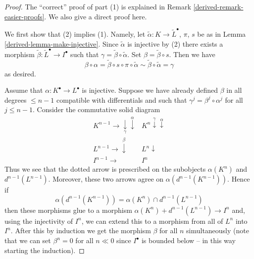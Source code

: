 \begin{proof}

The ``correct'' proof of part (1) is explained in
Remark \ref{derived-remark-easier-proofs}.
We also give a direct proof here.

\medskip\noindent
We first show that (2) implies (1). Namely, let
$\tilde \alpha : K \to \tilde L^\bullet$, $\pi$, $s$ be as in
Lemma \ref{derived-lemma-make-injective}. Since $\tilde \alpha$ is injective
by (2) there exists a morphism $\tilde \beta : \tilde L^\bullet \to I^\bullet$
such that $\gamma = \tilde \beta \circ \tilde \alpha$. Set
$\beta = \tilde \beta \circ s$. Then we have
$$
\beta \circ \alpha
=
\tilde \beta \circ s \circ \pi \circ \tilde \alpha
\sim
\tilde \beta \circ \tilde \alpha
=
\gamma
$$
as desired.

\medskip\noindent
Assume that $\alpha : K^\bullet \to L^\bullet$ is injective.
Suppose we have already defined $\beta$ in all degrees
$\leq n - 1$ compatible with differentials and such that
$\gamma^j = \beta^j \circ \alpha^j$ for all $j \leq n - 1$.
Consider the commutative solid diagram
$$
\begin{array}{cc}K^{n - 1} \longrightarrow\underset{\gamma}{\downarrow}\overset{\alpha}{\downarrow} & K^n \overset{\gamma}{\downarrow}\overset{\alpha}{\downarrow} \\ L^{n - 1} \longrightarrow\overset{\beta}{\downarrow} & L^n \downarrow \\ I^{n - 1} \longrightarrow & I^n\end{array}
$$
Thus we see that the dotted arrow is prescribed on the subobjects
$\alpha(K^n)$ and $d^{n - 1}(L^{n - 1})$. Moreover, these two arrows
agree on $\alpha(d^{n - 1}(K^{n - 1}))$. Hence if
\begin{equation}
\label{equation-qis}
\alpha(d^{n - 1}(K^{n - 1}))
=
\alpha(K^n) \cap d^{n - 1}(L^{n - 1})
\end{equation}
then these morphisms glue to a morphism
$\alpha(K^n) + d^{n - 1}(L^{n - 1}) \to I^n$ and, using the injectivity
of $I^n$, we can extend this to a morphism from all of $L^n$ into $I^n$.
After this by induction we get the morphism $\beta$ for all $n$ simultaneously
(note that we can set $\beta^n = 0$ for all $n \ll 0$ since $I^\bullet$
is bounded below -- in this way starting the induction).


\end{proof}
